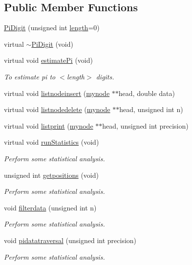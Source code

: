 \subsection*{Public Member Functions}
\begin{DoxyCompactItemize}
\item 
\mbox{\hyperlink{classPiDigit_a6c2d826e03edc8390476d0002aaa2d46}{Pi\+Digit}} (unsigned int \mbox{\hyperlink{classPiDigit_adeaaf0996ef9c846df7ba38b4949ad99}{length}}=0)
\item 
virtual \mbox{\hyperlink{classPiDigit_aa0f42ed34e114727252adf725dcb6423}{$\sim$\+Pi\+Digit}} (void)
\item 
virtual void \mbox{\hyperlink{classPiDigit_a22de7b729cf3eb47aa7cb18ba3e25a2e}{estimate\+Pi}} (void)
\begin{DoxyCompactList}\small\item\em To estimate pi to $<$length$>$ digits. \end{DoxyCompactList}\item 
virtual void \mbox{\hyperlink{classPiDigit_a2cd414a3059a0ba20a9fa47a09dd7dd0}{listnodeinsert}} (\mbox{\hyperlink{structPiDigit_1_1mynode}{mynode}} $\ast$$\ast$head, double data)
\item 
virtual void \mbox{\hyperlink{classPiDigit_af025a33c3fbc5639d8843f32a19f2a51}{listnodedelete}} (\mbox{\hyperlink{structPiDigit_1_1mynode}{mynode}} $\ast$$\ast$head, unsigned int n)
\item 
virtual void \mbox{\hyperlink{classPiDigit_ae905d997df53e6e2795313174d1a18d6}{listprint}} (\mbox{\hyperlink{structPiDigit_1_1mynode}{mynode}} $\ast$$\ast$head, unsigned int precision)
\item 
virtual void \mbox{\hyperlink{classPiDigit_a015de54a634ef5657639269d02668927}{run\+Statistics}} (void)
\begin{DoxyCompactList}\small\item\em Perform some statistical analysis. \end{DoxyCompactList}\item 
unsigned int \mbox{\hyperlink{classPiDigit_af7c707f9f6abf02da5a629c6808724d9}{getpositions}} (void)
\begin{DoxyCompactList}\small\item\em Perform some statistical analysis. \end{DoxyCompactList}\item 
void \mbox{\hyperlink{classPiDigit_aa14bbb69f9e54b0c750596ee1b2b6f6a}{filterdata}} (unsigned int n)
\begin{DoxyCompactList}\small\item\em Perform some statistical analysis. \end{DoxyCompactList}\item 
void \mbox{\hyperlink{classPiDigit_a65472a23d6e66b78e2101e67cc24b03a}{pidatatraversal}} (unsigned int precision)
\begin{DoxyCompactList}\small\item\em Perform some statistical analysis. \end{DoxyCompactList}\end{DoxyCompactItemize}
